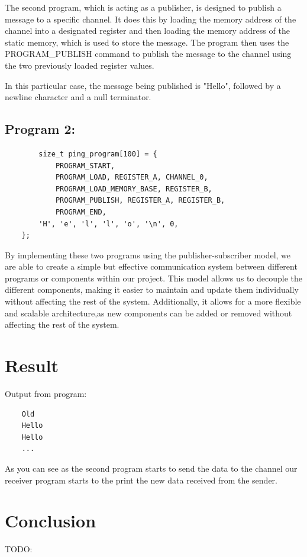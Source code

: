 \documentclass[12pt]{report}
\begin{document}
    The second program, which is acting as a publisher, is designed to publish a message to a specific channel.
    It does this by loading the memory address of the channel into a designated register and then loading the memory address
    of the static memory, which is used to store the message. The program then uses the PROGRAM\_PUBLISH command to publish 
    the message to the channel using the two previously loaded register values. 

    In this particular case, the message being published is "Hello", followed by a newline character and a null terminator. 

    \pagebreak
    \section{Program 2:}
    \begin{verbatim}
        size_t ping_program[100] = { 
            PROGRAM_START, 
            PROGRAM_LOAD, REGISTER_A, CHANNEL_0,
            PROGRAM_LOAD_MEMORY_BASE, REGISTER_B,     
            PROGRAM_PUBLISH, REGISTER_A, REGISTER_B, 
            PROGRAM_END, 
        'H', 'e', 'l', 'l', 'o', '\n', 0, 
    }; 
    \end{verbatim}

    By implementing these two programs using the publisher-subscriber model, we are able to create a simple but effective communication 
    system between different programs or components within our project. This model allows us to decouple the different components, 
    making it easier to maintain and update them individually without affecting the rest of the system. Additionally, 
    it allows for a more flexible and scalable architecture,as new components can be added or removed without affecting the rest of the system. 

    \chapter{Result}
    Output from program:
    \begin{verbatim}
    Old
    Hello
    Hello
    ...
    \end{verbatim}
    
    As you can see as the second program starts to send the data to the channel our receiver program starts to the print the new data received from the sender.

    \chapter{Conclusion}
    TODO:
\end{document}
